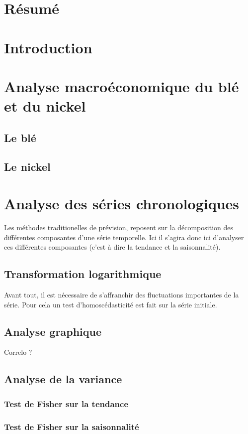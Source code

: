\documentclass[11pt,a4paper]{article}
\begin{document}
\clearpage
\section*{Résumé}
\setcounter{tocdepth}{6}
\renewcommand\contentsname{Sommaire}
\tableofcontents
\newpage
\pagestyle{fancy}
\fancyhead{}\fancyfoot{}

\section*{Introduction}
\section{Analyse macroéconomique du blé et du nickel}
\subsection{Le blé}
\subsection{Le nickel}
\section{Analyse des séries chronologiques}
Les méthodes traditionelles de prévision, reposent sur la décomposition des différentes composantes d'une série temporelle. Ici il s'agira donc
ici d'analyser ces différentes composantes (c'est à dire la tendance et la saisonnalité).
\subsection{Transformation logarithmique}
Avant tout, il est nécessaire de s'affranchir des fluctuations importantes de la série. Pour cela un test d'homoscédasticité est fait sur la série 
initiale.
\subsection{Analyse graphique}
Correlo ?
\subsection{Analyse de la variance}
\subsubsection{Test de Fisher sur la tendance}
\subsubsection{Test de Fisher sur la saisonnalité}
\end{document}
